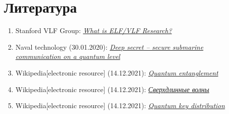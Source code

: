 \documentclass[a4paper,12pt]{article} %
\begin{document}
\section*{Литература}
\begin{enumerate}
\item Stanford VLF Group: \href{https://vlfstanford.ku.edu.tr/research_topic_inlin/introduction-vlf/}{\it What is ELF/VLF Research?}
\item Naval technology (30.01.2020): \href{https://www.naval-technology.com/features/featuredeep-secret-secure-submarine-communication-on-a-quantum-level/?utm_source=Army%20Technology&utm_medium=website&utm_campaign=Must%20Read&utm_content=Image}{\it Deep secret – secure submarine communication on a quantum level}
\item Wikipedia[electronic resource] (14.12.2021): \href{https://en.wikipedia.org/wiki/Quantum_entanglement}{\it Quantum entanglement}
\item Wikipedia[electronic resource] (14.12.2021): \href{https://ru.wikipedia.org/wiki/%D0%A1%D0%B2%D0%B5%D1%80%D1%85%D0%B4%D0%BB%D0%B8%D0%BD%D0%BD%D1%8B%D0%B5_%D0%B2%D0%BE%D0%BB%D0%BD%D1%8B}{\it Сверхдлинные волны}
\item Wikipedia[electronic resource] (14.12.2021): \href{https://en.wikipedia.org/wiki/Quantum_key_distribution}{\it Quantum key distribution}
\end{enumerate}
\end{document}
